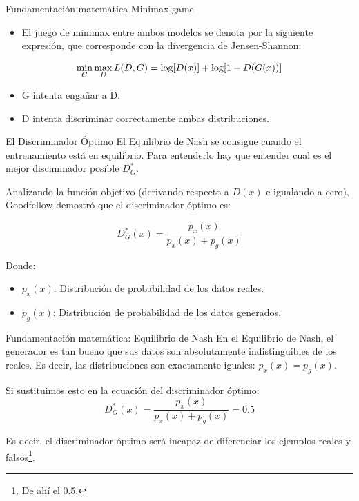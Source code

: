 \begin{frame}{Fundamentación matemática}
\hfill
\vfill
{\Large Minimax game}
\begin{itemize}
    \item El juego de \alert{minimax} entre ambos modelos se denota por la siguiente expresión, que corresponde con la divergencia de \alert{Jensen-Shannon}:
\end{itemize}

\begin{equation}
    \Large \min _{G} \max _{D} L(D, G)=\log [D(x)]+\log [1-D(G(x))]
\end{equation}

\begin{itemize}
    \item \alert{G} intenta \alert{engañar} a \alert{D}.
    \item \alert{D} intenta \alert{discriminar} correctamente ambas \alert{distribuciones}.
\end{itemize}
\end{frame}

\begin{frame}{El Discriminador Óptimo}
El \alert{Equilibrio de Nash} se consigue cuando el entrenamiento está en equilibrio. Para entenderlo hay que entender cual es el mejor disciminador posible $D^*_G$.

Analizando la función objetivo (derivando respecto a $D(x)$ e igualando a cero), Goodfellow\cite{goodfellow2014generative} demostró que el discriminador óptimo es:

\begin{equation}
    D^*_G(x) = \frac{p_{x}(x)}{p_{x}(x) + p_g(x)}
\end{equation}

Donde:
\begin{itemize}
    \item \alert{$p_{x}(x)$}: Distribución de probabilidad de los datos reales.
    \item \alert{$p_g(x)$}: Distribución de probabilidad de los datos generados.
\end{itemize}
\end{frame}

\begin{frame}{Fundamentación matemática: Equilibrio de Nash}
En el \alert{Equilibrio de Nash}, el generador es tan bueno que sus datos son absolutamente indistinguibles de los reales. Es decir, las distribuciones son exactamente iguales: \alert{$p_{x}(x) = p_g(x)$}.

Si sustituimos esto en la ecuación del discriminador óptimo:
\begin{equation}
    D^*_G(x) = \frac{p_{x}(x)}{p_{x}(x) + p_{g}(x)} = 0.5
\end{equation}

Es decir, el discriminador óptimo será incapaz de diferenciar los ejemplos reales y falsos\footnote{De ahí el 0.5.}.
\end{frame}

